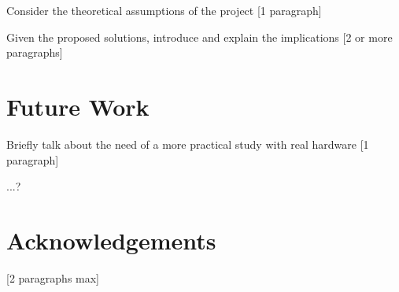 \documentclass{article}
\begin{document}
Consider the theoretical assumptions of the project [1 paragraph]

Given the proposed solutions, introduce and explain the implications [2 or more paragraphs]

\section{Future Work}

Briefly talk about the need of a more practical study with real hardware [1 paragraph]

...?

\section{Acknowledgements}

[2 paragraphs max]

\printbibliography


\end{document}
